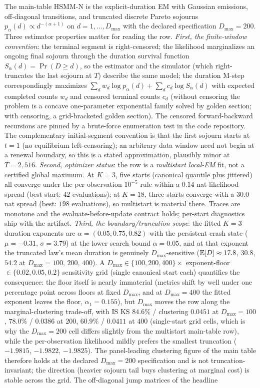 The main-table HSMM-N is the \citet{yu2010hidden} explicit-duration EM with Gaussian emissions, off-diagonal transitions, and truncated discrete Pareto sojourns $p_\alpha(d) \propto d^{-(\alpha+1)}$ on $d = 1, \ldots, D_{\max}$ with the declared specification $D_{\max} = 200$. Three estimator properties matter for reading the row. \emph{First, the finite-window convention}: the terminal segment is right-censored; the likelihood marginalizes an ongoing final sojourn through the duration survival function $S_\alpha(d) = \Pr(D \ge d)$, so the estimator and the simulator (which right-truncates the last sojourn at $T$) describe the same model; the duration M-step correspondingly maximizes $\sum_d w_d \log p_\alpha(d) + \sum_d c_d \log S_\alpha(d)$ with expected completed counts $w_d$ and censored terminal counts $c_d$ (without censoring the problem is a concave one-parameter exponential family solved by golden section; with censoring, a grid-bracketed golden section). The censored forward-backward recursions are pinned by a brute-force enumeration test in the code repository. The complementary initial-segment convention is that the first sojourn starts at $t = 1$ (no equilibrium left-censoring); an arbitrary data window need not begin at a renewal boundary, so this is a stated approximation, plausibly minor at $T = 2{,}516$. \emph{Second, optimizer status}: the row is a \emph{multistart local-EM} fit, not a certified global maximum. At $K = 3$, five starts (canonical quantile plus jittered) all converge under the per-observation $10^{-5}$ rule within a $0.14$-nat likelihood spread (best start: $42$ evaluations); at $K = 18$, three starts converge with a $30.0$-nat spread (best: $198$ evaluations), so multistart is material there. Traces are monotone and the evaluate-before-update contract holds; per-start diagnostics ship with the artifact. \emph{Third, the boundary/truncation scope}: the fitted $K = 3$ duration exponents are $\alpha = (0.05, 0.75, 0.82)$ with the persistent crash state ($\mu = -0.31$, $\sigma = 3.79$) at the lower search bound $\alpha = 0.05$, and at that exponent the truncated law's mean duration is genuinely $D_{\max}$-sensitive ($\mathbb{E}[D] \approx 17.8$, $30.8$, $54.2$ at $D_{\max} = 100$, $200$, $400$). A $D_{\max} \in \{100, 200, 400\} \times$ exponent-floor $\in \{0.02, 0.05, 0.2\}$ sensitivity grid (single canonical start each) quantifies the consequence: the floor itself is nearly immaterial (metrics shift by well under one percentage point across floors at fixed $D_{\max}$, and at $D_{\max} = 400$ the fitted exponent leaves the floor, $\alpha_1 = 0.155$), but $D_{\max}$ moves the row along the marginal-clustering trade-off, with IS KS $84.6\%$ / clustering $0.0451$ at $D_{\max} = 100$, $78.0\%$ / $0.0386$ at $200$, $60.9\%$ / $0.0411$ at $400$ (single-start grid cells, which is why the $D_{\max} = 200$ cell differs slightly from the multistart main-table row), while the per-observation likelihood mildly prefers the smallest truncation ($-1.9815$, $-1.9822$, $-1.9825$). The panel-leading clustering figure of the main table therefore holds at the declared $D_{\max} = 200$ specification and is not truncation-invariant; the direction (heavier sojourn tail buys clustering at marginal cost) is stable across the grid. The off-diagonal jump matrices of the headline 